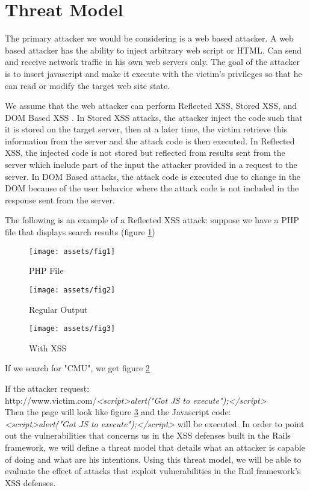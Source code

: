 \documentclass[10pt, conference, compsocconf]{IEEEtran}
\begin{document}
\section{Threat Model}
The primary attacker we would be considering is a web based attacker. A web based attacker has the ability to inject arbitrary web script or HTML. Can send and receive network traffic in his own web servers only. The goal of the attacker is to insert javascript and make it execute with the victim’s privileges so that he can read or modify the target web site state.

We assume that the web attacker can perform Reflected XSS, Stored XSS, and DOM Based XSS \cite{IEEEhowto:owasp}. In Stored XSS attacks, the attacker inject the code such that it is stored on the target server, then at a later time, the victim retrieve this information from the server and the attack code is then executed. In Reflected XSS, the injected code is not stored but reflected from results sent from the server which include part of the input the attacker provided in a request to the server. In DOM Based attacks, the attack code is executed due to change in the DOM because of the user behavior where the attack code is not included in the response sent from the server. 

The following is an example of a Reflected XSS attack: suppose we have a PHP file that displays search results (figure \ref{fig:figure1})

\begin{figure}[hb]
 \caption{PHP File}
 \label{fig:figure1}
 \centering
 \texttt{[image: assets/fig1]}
\end{figure}

\begin{figure}[hb]
 \caption{Regular Output}
 \label{fig:figure2}
 \centering
 \texttt{[image: assets/fig2]}
\end{figure}

\begin{figure}[hb]
 \caption{With XSS}
 \label{fig:figure3}
 \centering
 \texttt{[image: assets/fig3]}
\end{figure}

If we search for "CMU", we get figure \ref{fig:figure2}

If the attacker request:\\
http://www.victim.com/\emph{<script>alert("Got JS to execute");</script>}\\
Then the page will look like figure \ref{fig:figure3} and the Javascript code:\\ \emph{<script>alert("Got JS to execute");</script>} will be executed.
In order to point out the vulnerabilities that concerns us in the XSS defenses built in the Rails framework, we will define a threat model that details what an attacker is capable of doing and what are his intentions. Using this threat model, we will be able to evaluate the effect of attacks that exploit vulnerabilities in the Rail framework's XSS defenses. 
\end{document}
